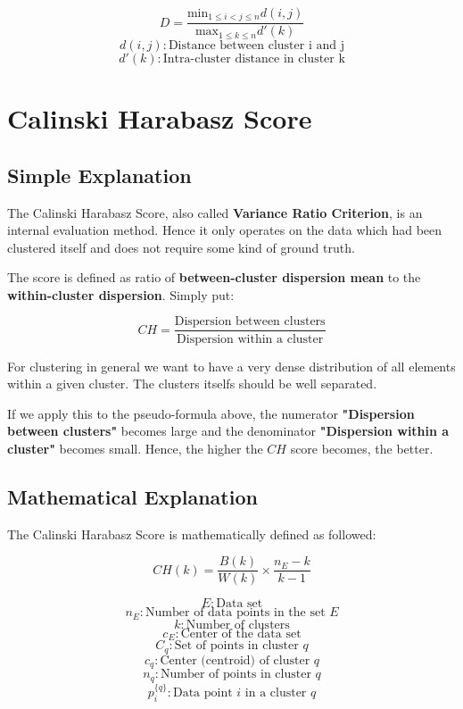 $$ D = \frac{ \text{min}_{1\leq i < j\leq n} d(i,j) }{ \text{max}_{1 \leq k \leq n} d'(k) } $$
$$ d(i,j) : \text{Distance between cluster i and j}$$
$$d'(k) : \text{Intra-cluster distance in cluster k}$$


\clearpage
\section{Calinski Harabasz Score}
\subsection{Simple Explanation}


The Calinski Harabasz Score, also called \textbf{Variance Ratio Criterion}, is an internal evaluation method. Hence it only operates on the data which had been clustered itself and does not require some kind of ground truth. 


The score is defined as ratio of \textbf{between-cluster dispersion mean} to the \textbf{within-cluster dispersion}.
Simply put:

$$ CH = \frac{\text{Dispersion between clusters}}{\text{Dispersion within a cluster}}  $$

For clustering in general we want to have a very dense distribution of all elements within a given cluster. The clusters itselfs should be well separated.

If we apply this to the pseudo-formula above, the numerator \textbf{"Dispersion between clusters"} becomes large and the denominator \textbf{"Dispersion within a cluster"} becomes small. Hence, the higher the $CH$ score becomes, the better. 



\clearpage
\subsection{Mathematical Explanation}

The Calinski Harabasz Score is mathematically defined as followed:


$$ CH(k) = \frac{B(k)}{W(k)} \times \frac{n_{E} - k}{k - 1} $$

$$ E : \text{Data set} $$
$$ n_{E} : \text{Number of data points in the set } E $$
$$ k : \text{Number of clusters} $$
$$ c_{E} : \text{Center of the data set} $$
$$ C_{q} : \text{Set of points in cluster } q $$
$$ c_{q} : \text{Center (centroid) of cluster } q $$
$$ n_{q} : \text{Number of points in cluster } q $$
$$p_{i}^{\{q\}} : \text{Data point } i \text{ in a cluster } q $$

